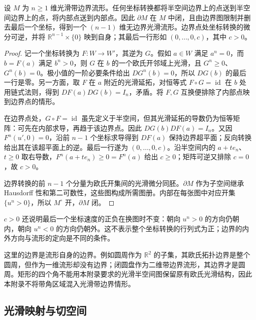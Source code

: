 \begin{proposition}[边界的坐标不变性]\label{b1:prop:E-boundary-invariance}
设 \(M\) 为 \(n\geq1\) 维光滑带边界流形。任何坐标转换都将半空间边界上的点送到半空间边界上的点，将内部点送到内部点。因此 \(\partial M\) 在 \(M\) 中闭，且由边界图限制并删去最后一个坐标，得到一个 \((n-1)\) 维无边界光滑流形。边界点处坐标转换的微分可逆，并将 \(\mathbb R^{n-1}\times\{0\}\) 映到自身；其最后一行形如 \((0,\ldots,0,c)\)，其中 \(c>0\)。
\end{proposition}
\begin{proof}
记一个坐标转换为 \(F:W\rightarrow W'\)，其逆为 \(G\)。假如 \(a\in W\) 满足 \(a^n=0\)，而 \(b=F(a)\) 满足 \(b^n>0\)，则 \(G\) 在 \(b\) 的一个欧氏开邻域上光滑，且 \(G^n\geq0\)、\(G^n(b)=0\)。极小值的一阶必要条件给出 \(DG^n(b)=0\)，所以 \(DG(b)\) 的最后一行是零。另一方面，取 \(F\) 在 \(a\) 附近的光滑延拓，对恒等式 \(F\circ G=\operatorname{id}\) 在 \(b\) 处用链式法则，得到 \(DF(a)DG(b)=I_n\)，矛盾。将 \(F,G\) 互换便排除了内部点映到边界点的情形。

在边界点处，\(G\circ F=\operatorname{id}\) 虽先定义于半空间，但其光滑延拓的导数仍为恒等矩阵：可先在内部求导，再趋于该边界点。因此 \(DG(b)DF(a)=I_n\)。又因 \(F^n(u',0)=0\)，沿前 \(n-1\) 个坐标求导得到 \(DF(a)\) 保持边界超平面；反向转换给出其在该超平面上的逆。最后一行遂为 \((0,\ldots,0,c)\)。沿半空间内的 \(a+te_n\)、\(t\geq0\) 取右导数，\(F^n(a+te_n)\geq0=F^n(a)\) 给出 \(c\geq0\)；矩阵可逆又排除 \(c=0\)，故 \(c>0\)。

边界转换的前 \(n-1\) 个分量为欧氏开集间的光滑微分同胚。\(\partial M\) 作为子空间继承 Hausdorff 性和第二可数性，这些图构成所需图册。内部在每张图中对应开集 \(\{u^n>0\}\)，所以 \(M^\circ\) 开，\(\partial M\) 闭。
\end{proof}

\(c>0\) 还说明最后一个坐标速度的正负在换图时不变：朝向 \(u^n>0\) 的方向仍朝内，朝向 \(u^n<0\) 的方向仍朝外。这不表示整个坐标转换的行列式为正；边界的内外方向与流形的定向是不同的条件。

\ProseParagraphBreak

这里的边界是流形自身的边界。例如圆周作为 \(\mathbb R^2\) 的子集，其欧氏拓扑边界是整个圆周，但作为一维流形却没有边界；闭圆盘作为二维带边界流形，其边界才是圆周。矩形的四个角不能用本附录要求的光滑半空间图保留原有欧氏光滑结构，因此本附录不将带角区域混入光滑带边界情形。

\subsection{光滑映射与切空间}
\label{b1:subsec:E10102}

